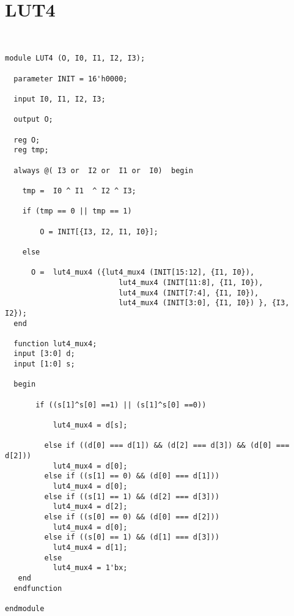 \section{LUT4}
\begin{lstlisting}


module LUT4 (O, I0, I1, I2, I3);

  parameter INIT = 16'h0000;

  input I0, I1, I2, I3;

  output O;

  reg O;
  reg tmp;

  always @( I3 or  I2 or  I1 or  I0)  begin
 
    tmp =  I0 ^ I1  ^ I2 ^ I3;

    if (tmp == 0 || tmp == 1)

        O = INIT[{I3, I2, I1, I0}];

    else 
    
      O =  lut4_mux4 ({lut4_mux4 (INIT[15:12], {I1, I0}),
                          lut4_mux4 (INIT[11:8], {I1, I0}),
                          lut4_mux4 (INIT[7:4], {I1, I0}),
                          lut4_mux4 (INIT[3:0], {I1, I0}) }, {I3, I2});
  end

  function lut4_mux4;
  input [3:0] d;
  input [1:0] s;
   
  begin

       if ((s[1]^s[0] ==1) || (s[1]^s[0] ==0))
           
           lut4_mux4 = d[s];

         else if ((d[0] === d[1]) && (d[2] === d[3]) && (d[0] === d[2])) 
           lut4_mux4 = d[0];
         else if ((s[1] == 0) && (d[0] === d[1]))
           lut4_mux4 = d[0];
         else if ((s[1] == 1) && (d[2] === d[3])) 
           lut4_mux4 = d[2];
         else if ((s[0] == 0) && (d[0] === d[2])) 
           lut4_mux4 = d[0];
         else if ((s[0] == 1) && (d[1] === d[3]))
           lut4_mux4 = d[1];
         else
           lut4_mux4 = 1'bx;
   end
  endfunction

endmodule

\end{lstlisting}

